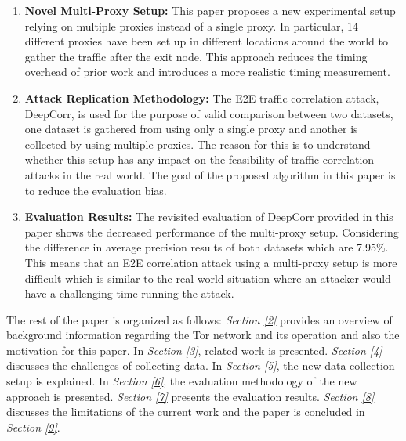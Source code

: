 \documentclass[sigconf]{acmart}
\begin{document}
\begin{enumerate}[label=(\roman*)]

\item \textbf{Novel Multi-Proxy Setup:} This paper proposes a new experimental setup relying on multiple proxies instead of a single proxy. In particular, 14 different proxies have been set up in different locations around the world to gather the traffic after the exit node. This approach reduces the timing overhead of prior work \cite{nasr2018deepcorr} and introduces a more realistic timing measurement.

\item \textbf{Attack Replication Methodology:} The E2E traffic correlation attack, DeepCorr, is used for the purpose of valid comparison between two datasets, one dataset is gathered from using only a single proxy and another is collected by using multiple proxies. The reason for this is to understand whether this setup has any impact on the feasibility of traffic correlation attacks in the real world. The goal of the proposed algorithm in this paper is to reduce the evaluation bias.

\item \textbf{Evaluation Results:} The revisited evaluation of DeepCorr provided in this paper shows the decreased performance of the multi-proxy setup. Considering the difference in average precision results of both datasets which are 7.95\%. This means that an E2E correlation attack using a multi-proxy setup is more difficult which is similar to the real-world situation where an attacker would have a challenging time running the attack. 

\end{enumerate}

\vspace{2mm}

The rest of the paper is organized as follows: \textit{Section \ref{2}} provides an overview of background information regarding the Tor network and its operation and also the motivation for this paper. In \textit{Section \ref{3}}, related work is presented. \textit{Section \ref{4}} discusses the challenges of collecting data. In \textit{Section \ref{5}}, the new data collection setup is explained. In \textit{Section \ref{6}}, the evaluation methodology of the new approach is presented. \textit{Section \ref{7}} presents the evaluation results. \textit{Section \ref{8}} discusses the limitations of the current work and the paper is concluded in \textit{Section \ref{9}}.
\\~\\
\end{document}
